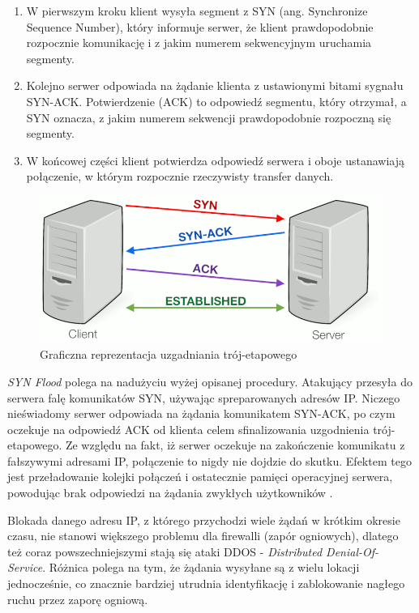 \documentclass[12pt,twoside]{article}
\begin{document}
\begin{enumerate}
	\item W pierwszym kroku klient wysyła segment z SYN (ang. Synchronize Sequence Number), który informuje serwer, że klient prawdopodobnie rozpocznie komunikację i z jakim numerem sekwencyjnym uruchamia segmenty.
	\item Kolejno serwer odpowiada na żądanie klienta z ustawionymi bitami sygnału SYN-ACK. Potwierdzenie (ACK) to odpowiedź segmentu, który otrzymał, a SYN oznacza, z jakim numerem sekwencji prawdopodobnie rozpoczną się segmenty.
	\item W końcowej części klient potwierdza odpowiedź serwera i oboje ustanawiają połączenie, w którym rozpocznie rzeczywisty transfer danych.
\end{enumerate}


\begin{figure}[H]
	\centering
	\includegraphics[width=0.7\linewidth]{figures/3-way-handshake}
	\caption{Graficzna reprezentacja uzgadniania trój-etapowego \cite{ThreeWayHandshakePicture}}
	\label{fig:3-way-handshake}
\end{figure}

\emph{SYN Flood} polega na nadużyciu wyżej opisanej procedury. Atakujący przesyła do serwera falę komunikatów SYN, używając spreparowanych adresów IP. Niczego nieświadomy serwer odpowiada na żądania komunikatem SYN-ACK, po czym oczekuje na odpowiedź ACK od klienta celem sfinalizowania uzgodnienia trój-etapowego. Ze względu na fakt, iż serwer oczekuje na zakończenie komunikatu z fałszywymi adresami IP, połączenie to nigdy nie dojdzie do skutku. Efektem tego jest przeładowanie kolejki połączeń i ostatecznie pamięci operacyjnej serwera, powodując brak odpowiedzi na żądania zwykłych użytkowników \cite{DDosHowItWorks}. 

Blokada danego adresu IP, z którego przychodzi wiele żądań w krótkim okresie czasu, nie stanowi większego problemu dla firewalli (zapór ogniowych), dlatego też coraz powszechniejszymi stają się ataki DDOS - \emph{Distributed Denial-Of-Service}. Różnica polega na tym, że żądania wysyłane są z wielu lokacji jednocześnie, co znacznie bardziej utrudnia identyfikację i zablokowanie nagłego ruchu przez zaporę ogniową.
\end{document}

